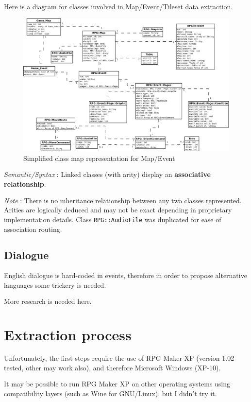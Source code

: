 \documentclass[11pt]{article}
\begin{document}
\vspace{4mm}
Here is a diagram for classes involved in Map/Event/Tileset data extraction.
\begin{figure}[!h]
	\centering
	\includegraphics[width=\linewidth]{RMXP_full}
	\caption{Simplified class map representation for Map/Event}
	
\end{figure}


\textit{Semantic/Syntax} : Linked classes (with arity) display an \textbf{associative relationship}.

\textit{Note} : There is no inheritance relationship between any two classes represented. Arities are logically deduced and may not be exact depending in proprietary implementation details. Class \verb|RPG::AudioFile| was duplicated for ease of association routing.


\subsection{Dialogue}

English dialogue is hard-coded in events, therefore in order to propose alternative languages some trickery is needed.

More research is needed here.


\section{Extraction process}

Unfortunately, the first steps require the use of RPG Maker XP (version 1.02 tested, other may work also), and therefore Microsoft Windows (XP-10).

It may be possible to run RPG Maker XP on other operating systems using compatibility layers (such as Wine for GNU/Linux), but I didn't try it.
\end{document}
